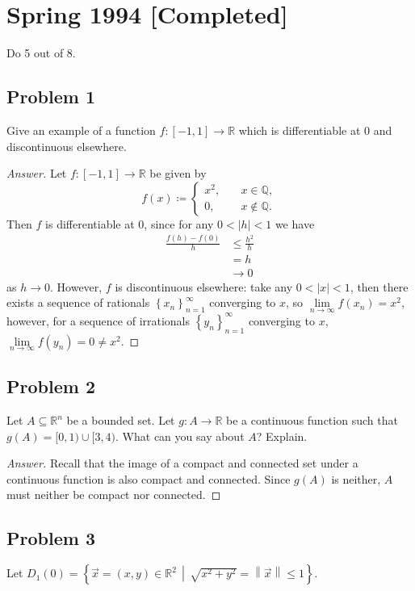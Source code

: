 \documentclass[12pt]{article}
\newcommand{\q}{\mathbb{Q}}
\newcommand{\real}{\mathbb{R}}
\newcommand\paren[1]{\left( #1 \right)}
\newcommand\setb[1]{\left \{ #1 \right \}}
\newcommand{\norm}[1]{\left\| #1 \right\|}
\theoremstyle{definition}
\begin{document}
\section{Spring 1994 [Completed]}
Do 5 out of 8.
\subsection{Problem 1 \texorpdfstring{\cite{Lin}}{}}
Give an example of a function $f : [-1,1] \to \real$ which is differentiable at $0$ and discontinuous elsewhere.
\begin{proof}[Answer]
    Let $f : [-1,1] \to \real$ be given by 
    \[
        f(x) \coloneqq 
        \begin{cases}
            x^2 , & \quad x \in \q , \\
            0 , & \quad x \notin \q.
        \end{cases}
    \]
    Then $f$ is differentiable at $0$, since for any $0 < |h| < 1$ we have
    \begin{align*}
        \frac{f(h) - f(0)}{h} & \leq \frac{h^2}{h} \\
        & = h \\
        & \to 0
    \end{align*}
    as $h \to 0$. However, $f$ is discontinuous elsewhere: take any $0 < |x| < 1$, then there exists a sequence of rationals $\setb{ x_n }_{n=1}^{\infty}$ converging to $x$, so $\lim\limits_{n \to \infty} f \paren{ x_n } = x^2$, however, for a sequence of irrationals $\setb{ y_n }_{n=1}^{\infty}$ converging to $x$, $\lim\limits_{n \to \infty} f \paren{ y_n } = 0 \neq x^2$.
\end{proof}
\subsection{Problem 2}
Let $A \subseteq \real^n$ be a bounded set. Let $g : A \to \real$ be a continuous function such that $g(A) = [0,1) \cup [3,4)$. What can you say about $A$? Explain.
\begin{proof}[Answer]
    Recall that the image of a compact and connected set under a continuous function is also compact and connected. Since $g(A)$ is neither, $A$ must neither be compact nor connected.
\end{proof}
\subsection{Problem 3 \texorpdfstring{\cite{Desmos}}{}}
Let $D_1(0) = \setb{ \vec{x} = (x,y) \in \real^2 \, \middle| \, \sqrt{x^2 + y^2} = \norm{ \vec{x} } \leq 1 }$.
\end{document}
